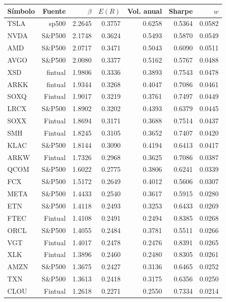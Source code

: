 \begin{table}[htbp]
\centering
\begin{tabular}{lrrrrrr}
\hline
Símbolo & Fuente & $\beta$ & $E(R)$ & Vol. anual & Sharpe & $w$ \\
\hline
TSLA & sp500 & 2.2645 & 0.3757 & 0.6258 & 0.5364 & 0.0582 \\
NVDA & S\&P500 & 2.1748 & 0.3624 & 0.5493 & 0.5870 & 0.0549 \\
AMD & S\&P500 & 2.0717 & 0.3471 & 0.5043 & 0.6090 & 0.0511 \\
AVGO & S\&P500 & 2.0080 & 0.3377 & 0.5162 & 0.5767 & 0.0488 \\
XSD & fintual & 1.9806 & 0.3336 & 0.3893 & 0.7543 & 0.0478 \\
ARKK & fintual & 1.9344 & 0.3268 & 0.4047 & 0.7086 & 0.0461 \\
SOXQ & Fintual & 1.9017 & 0.3219 & 0.3761 & 0.7497 & 0.0449 \\
LRCX & S\&P500 & 1.8902 & 0.3202 & 0.4393 & 0.6379 & 0.0445 \\
SOXX & Fintual & 1.8694 & 0.3171 & 0.3688 & 0.7514 & 0.0437 \\
SMH & Fintual & 1.8245 & 0.3105 & 0.3652 & 0.7407 & 0.0420 \\
KLAC & S\&P500 & 1.8144 & 0.3090 & 0.4194 & 0.6413 & 0.0417 \\
ARKW & Fintual & 1.7326 & 0.2968 & 0.3625 & 0.7086 & 0.0387 \\
QCOM & S\&P500 & 1.6022 & 0.2775 & 0.3806 & 0.6241 & 0.0339 \\
FCX & S\&P500 & 1.5172 & 0.2649 & 0.4012 & 0.5606 & 0.0307 \\
META & S\&P500 & 1.4433 & 0.2540 & 0.3617 & 0.5915 & 0.0280 \\
ETN & S\&P500 & 1.4118 & 0.2493 & 0.3253 & 0.6433 & 0.0269 \\
FTEC & Fintual & 1.4108 & 0.2491 & 0.2494 & 0.8385 & 0.0268 \\
ORCL & S\&P500 & 1.4055 & 0.2484 & 0.3781 & 0.5511 & 0.0266 \\
VGT & Fintual & 1.4017 & 0.2478 & 0.2476 & 0.8391 & 0.0265 \\
XLK & Fintual & 1.3896 & 0.2460 & 0.2480 & 0.8305 & 0.0261 \\
AMZN & S\&P500 & 1.3675 & 0.2427 & 0.3136 & 0.6465 & 0.0252 \\
TXN & S\&P500 & 1.3613 & 0.2418 & 0.3175 & 0.6356 & 0.0250 \\
CLOU & Fintual & 1.2618 & 0.2271 & 0.2550 & 0.7334 & 0.0214 \\

\end{tabular}
\end{table}
